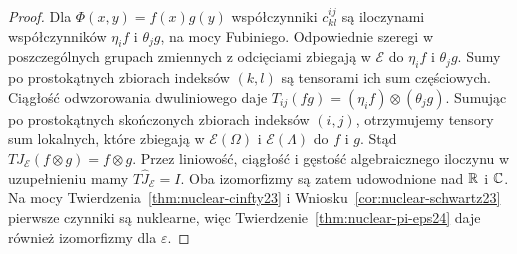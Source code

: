\begin{proof}
Dla $\Phi(x,y)=f(x)g(y)$ współczynniki $c_{kl}^{ij}$
są iloczynami współczynników $\eta_i f$ i $\theta_j g$,
na mocy Fubiniego. Odpowiednie szeregi w poszczególnych grupach zmiennych
z odcięciami zbiegają w $\mathcal E$
do $\eta_i f$ i $\theta_j g$. Sumy po prostokątnych
zbiorach indeksów $(k,l)$ są tensorami ich sum
częściowych. Ciągłość odwzorowania dwuliniowego
daje $T_{ij}(fg)=(\eta_i f)\otimes(\theta_j g)$.
Sumując po prostokątnych skończonych zbiorach
indeksów $(i,j)$, otrzymujemy tensory sum lokalnych,
które zbiegają w $\mathcal E(\Omega)$ i
$\mathcal E(\Lambda)$ do $f$ i $g$.
Stąd $T J_{\mathcal E}(f\otimes g)=f\otimes g$.
Przez liniowość, ciągłość i gęstość algebraicznego
iloczynu w uzupełnieniu mamy $T\widehat J_{\mathcal E}=I$.
Oba izomorfizmy są zatem udowodnione nad $\mathbb R$ i $\mathbb C$.
Na mocy Twierdzenia~\ref{thm:nuclear-cinfty23}
i Wniosku~\ref{cor:nuclear-schwartz23} pierwsze
czynniki są nuklearne, więc
Twierdzenie~\ref{thm:nuclear-pi-eps24}
daje również izomorfizmy dla $\varepsilon$.
\end{proof}
